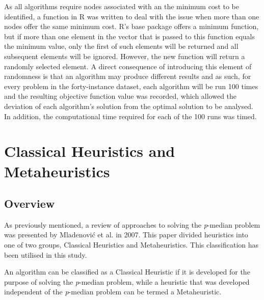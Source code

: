 \documentclass[11pt]{article}
\begin{document}
	As all algorithms require nodes associated with an the minimum cost to be identified, a function in R  was written to deal with the issue when more than one nodes offer the same minimum cost.  R's base package offers a minimum function, but if more than one element in the vector that is passed to this function equals the minimum value, only the first of such elements will be returned and all subsequent elements will be ignored.  However, the new function will return a randomly selected element.  A direct consequence of introducing this element of randomness is that an algorithm may produce different results and as such, for every problem in the forty-instance dataset, each algorithm will be run 100 times and the resulting objective function value was recorded, which allowed the deviation of each algorithm's solution from the optimal solution to be analysed.  In addition, the computational time required for each of the 100 runs was timed.
	
		
	\section{Classical Heuristics and Metaheuristics} \label{classical.meta.heuristics}
	\subsection{Overview} \label{heuristics.overview}
	As previously mentioned, a review of approaches to solving the \textit{p}-median problem was presented by Mladenovi\'{c} et al. \cite{MLAD07} in 2007.  This paper divided heuristics into one of two groups, Classical Heuristics and Metaheuristics.  This classification has been utilised in this study.
	
	An algorithm can be classified as a Classical Heuristic if it is developed for the purpose of solving the \emph{p}-median problem, while a heuristic that was developed independent of the \emph{p}-median problem can be termed a Metaheuristic.
		
	
\end{document}
